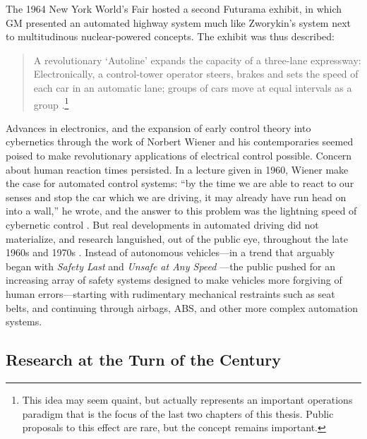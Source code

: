 

The 1964 New York World's Fair hosted a second Futurama exhibit, in
which GM presented an automated highway system much like Zworykin's
system next to multitudinous nuclear-powered concepts. The exhibit was
thus described: 
\begin{quote}A revolutionary `Autoline' expands the capacity of a three-lane
expressway: Electronically, a control-tower operator steers, brakes
and sets the speed of each car in an automatic lane; groups of cars
move at equal intervals as a group \cite[p. 9]{wetmore}.\footnote{This
idea may seem quaint, but actually represents an important operations
paradigm that is the focus of the last two chapters of this thesis.
Public proposals to this effect are rare, but the concept remains
important.}\end{quote}
 Advances in
electronics, and the expansion of early control theory into
cybernetics through the work of Norbert Wiener and his contemporaries seemed
poised to make revolutionary applications of electrical control
possible. Concern about human reaction times persisted. In a lecture given in 1960, Wiener
make the case for automated control systems: ``by the time we are able
to react to our senses and stop the car which we are driving, it may
already have run head on into a wall,'' he wrote, and the answer to
this problem was the lightning speed of cybernetic control \cite{wienerOn}. But real
developments in automated driving did not materialize, and research
languished, out of the public eye, throughout the late 1960s and 1970s
\cite[p. 10]{wetmore}. Instead of autonomous vehicles---in a trend
that arguably began
with \emph{Safety Last} \cite{oconnellmyers} and \emph{Unsafe at Any Speed} \cite{nader}---the public pushed
for an
increasing array of safety systems designed to make vehicles more forgiving
of human errors---starting with rudimentary
mechanical restraints such as seat belts, and continuing through
airbags, ABS, and other more complex automation systems.

\subsection{Research at the Turn of the Century}

